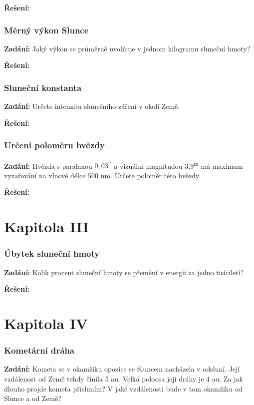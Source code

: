 \documentclass{article}
\begin{document}
\textbf{Řešení:}

\section*{Měrný výkon Slunce}
\textbf{Zadání:} Jaký výkon se průměrně uvolňuje v jednom kilogramu sluneční hmoty?

\textbf{Řešení:}

\section*{Sluneční konstanta}
\textbf{Zadání:} Určete intenzitu slunečního záření v okolí Země.

\textbf{Řešení:}

\section*{Určení poloměru hvězdy}
\textbf{Zadání:} Hvězda s paralaxou $0,03^{\prime\prime}$ a vizuální magnitudou 3,9\textsuperscript{m} má maximum vyzařování na
vlnové délce 500 nm. Určete poloměr této hvězdy.

\textbf{Řešení:}

\part*{Kapitola \textrm{I\hspace{-.1em}I\hspace{-.1em}I}}

\section*{Úbytek sluneční hmoty}
\textbf{Zadání:} Kolik procent sluneční hmoty se přemění v energii za jedno tisíciletí?

\textbf{Řešení:}

\part*{Kapitola \textrm{I\hspace{-.1em}V}}

\section*{Kometární dráha}
\textbf{Zadání:} Kometa se v okamžiku opozice se Sluncem nacházela v odsluní. Její vzdálenost od
Země tehdy činila 5 au. Velká poloosa její dráhy je 4 au. Za jak dlouho projde kometa přísluním?
V jaké vzdálenosti bude v tom okamžiku od Slunce a od Země?
\end{document}
